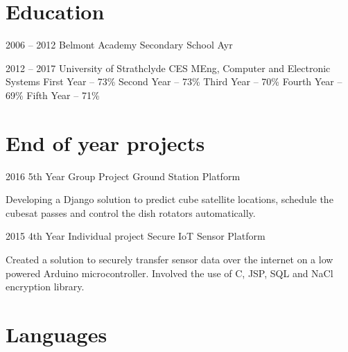 \documentclass{tccv}
\begin{document}

\section{Education}

\begin{school}

\item{2006 -- 2012}
     {Belmont Academy}
     {Secondary School}
     {Ayr}

\end{school}
\begin{uni}

\item{2012 -- 2017}
     {University of Strathclyde}
     {CES MEng, Computer and Electronic Systems}
     {First Year -- 73\%}
     {Second Year -- 73\%}
     {Third Year -- 70\%}
     {Fourth Year -- 69\%}
	{Fifth Year -- 71\%}
\end{uni}

\section{End of year projects}

\begin{yearlist}

\item{2016}
     {5th Year Group Project}
     {Ground Station Platform}
\end{yearlist}

Developing a Django solution to predict cube satellite locations, schedule the cubesat passes and control the dish rotators automatically. 
\\ 

\begin{yearlist}
\item{2015}
     {4th Year Individual project}
     {Secure IoT Sensor Platform}
\end{yearlist}

Created a solution to securely transfer sensor data over the internet on a low powered Arduino microcontroller. Involved the use of C, JSP, SQL and NaCl encryption library.

\section{Languages}
\end{document}
